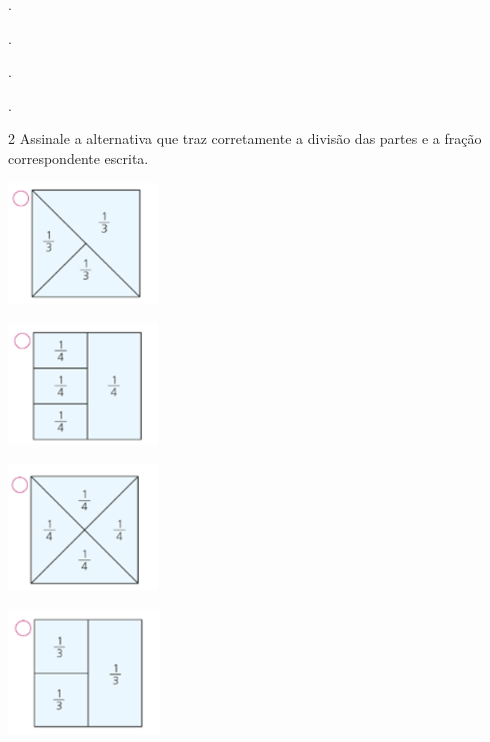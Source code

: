 \begin{mdframed}[linewidth=2pt,linecolor=salmao,roundcorner=2pt]
\begin{escolha}
{\begin{escolha}
\begin{escolha}
\item
  .

\item
  .

\item
  .

\item
  .
\end{escolha}


\num{2} Assinale a alternativa que traz corretamente a divisão das partes e a
fração correspondente escrita.

\begin{escolha}
\item
\includegraphics[width=1.55847in,height=1.26678in]{media/image123.png}

\item
\includegraphics[width=1.55847in,height=1.27511in]{media/image124.png}

\item
\includegraphics[width=1.56680in,height=1.31678in]{media/image125.png}

\item
\includegraphics[width=1.58347in,height=1.30845in]{media/image126.png}
\end{escolha}


\end{escolha}}
\end{escolha}
\end{mdframed}
